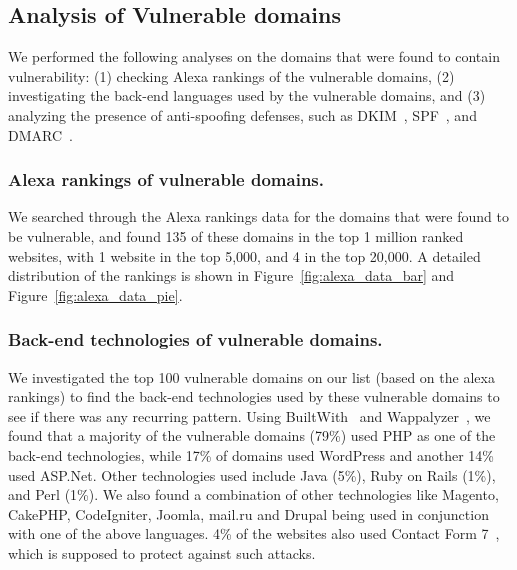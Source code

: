 
\subsection{Analysis of Vulnerable domains}


We performed the following analyses on the domains
that were found to contain \ehi vulnerability: (1) checking Alexa
rankings of the vulnerable domains, (2) investigating the back-end
languages used by the vulnerable domains, and (3) analyzing the presence
of anti-spoofing defenses, such as DKIM~\cite{allman2007domainkeys},
SPF~\cite{schlitt2006sender}, and DMARC~\cite{kucherawy2015domain}.



\subsubsection{Alexa rankings of vulnerable domains.}
We searched through the Alexa rankings data\cite{alexa} for the domains that were found to be vulnerable, and found 135 of these domains in the top 1 million ranked websites, with 1 website in the top 5,000, and 4 in the top 20,000. A detailed distribution of the rankings is shown in Figure~\ref{fig:alexa_data_bar} and Figure~\ref{fig:alexa_data_pie}.




\subsubsection{Back-end technologies of vulnerable domains.}
We investigated the top 100 vulnerable domains on our list (based on the alexa rankings) to find the back-end technologies used by these vulnerable domains to see if there was any recurring pattern. Using BuiltWith~\cite{builtwith} and Wappalyzer~\cite{wappalyzer}, we found that a majority of the vulnerable domains (79\%) used PHP as one of the back-end technologies, while 17\% of domains used WordPress and another 14\% used ASP.Net. Other technologies used include Java (5\%), Ruby on Rails (1\%), and Perl (1\%). We also found a combination of other technologies like Magento, CakePHP, CodeIgniter, Joomla, mail.ru and Drupal being used in conjunction with one of the above languages. 4\% of the websites also used Contact Form 7~\cite{CF7}, which is supposed to protect against such attacks.

